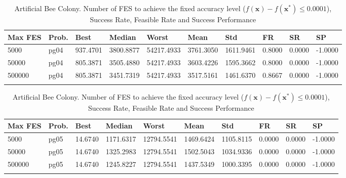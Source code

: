 \documentclass[10pt, a4paper]{book}
\begin{document}
\begin{center}
\begin{longtable}{l l l l l l l l l l}
\textbf{Max FES} & \textbf{Prob.} & \textbf{Best} & \textbf{Median} & \textbf{Worst} & \textbf{Mean} & \textbf{Std} & \textbf{FR} & \textbf{SR} & \textbf{SP} \\
\hline
5000 & pg04 & 937.4701 & 3800.8877 & 54217.4933 & 3761.3050 & 1611.9461 & 0.8000 & 0.0000 & -1.0000 \\
50000 & pg04 & 805.3871 & 3505.4880 & 54217.4933 & 3603.4226 & 1595.3662 & 0.8000 & 0.0000 & -1.0000 \\
500000 & pg04 & 805.3871 & 3451.7319 & 54217.4933 & 3517.5161 & 1461.6370 & 0.8667 & 0.0000 & -1.0000 \\

\caption{ Artificial Bee Colony. Number of FES to achieve the fixed accuracy level ($f(\mathbf{x}) - f(\mathbf{x}^{*}) \leq 0.0001$), Success Rate, Feasible Rate and Success Performance }
\end{longtable}
\end{center}

\begin{center}
\begin{longtable}{l l l l l l l l l l}
\textbf{Max FES} & \textbf{Prob.} & \textbf{Best} & \textbf{Median} & \textbf{Worst} & \textbf{Mean} & \textbf{Std} & \textbf{FR} & \textbf{SR} & \textbf{SP} \\
\hline
5000 & pg05 & 14.6740 & 1171.6317 & 12794.5541 & 1469.6424 & 1105.8115 & 0.0000 & 0.0000 & -1.0000 \\
50000 & pg05 & 14.6740 & 1325.2983 & 12794.5541 & 1502.5043 & 1034.9336 & 0.0000 & 0.0000 & -1.0000 \\
500000 & pg05 & 14.6740 & 1245.8227 & 12794.5541 & 1437.5349 & 1000.3395 & 0.0000 & 0.0000 & -1.0000 \\

\caption{ Artificial Bee Colony. Number of FES to achieve the fixed accuracy level ($f(\mathbf{x}) - f(\mathbf{x}^{*}) \leq 0.0001$), Success Rate, Feasible Rate and Success Performance }
\end{longtable}
\end{center}
\end{document}
